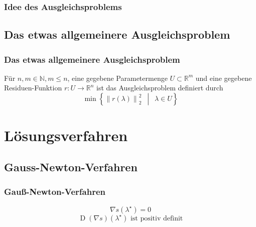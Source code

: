 \documentclass[aspectratio=169]{beamer}
\newcommand{\curvb}[1]{\left( #1 \right)}
\newcommand{\set}[2]{ \left\{ #1 \enspace \middle\vert \enspace #2 \right\} }
\newcommand{\norm}[1]{\left\| #1 \right\|}
\DeclareMathOperator{\Deriv}{\m{D}}
\newcommand{\SR}{\mathds{R}} %
\newcommand{\SN}{\mathds{N}} %
\newcommand{\m}[1]{\mathrm{#1}}
\begin{document}
			\begin{frame}
				\frametitle{Idee des Ausgleichsproblems}

				\begin{tcolorbox}
					\begin{figure}
							
						\end{figure}
				\end{tcolorbox}				
			\end{frame}
		

		\subsection{Das etwas allgemeinere Ausgleichsproblem} %
		\label{sub:das_etwas_allgemeinere_ausgleichsproblem}

			\begin{frame}
				\frametitle{Das etwas allgemeinere Ausgleichsproblem}

				\begin{tcolorbox}[title = Ausgleichsproblem mit Methode der kleinsten Quadrate]
					Für $n,m\in\SN, m\leq n$, eine gegebene Parametermenge $U\subset\SR^m$ und eine gegebene Residuen-Funktion $r:U\longrightarrow\SR^n$ ist das Ausgleichsproblem definiert durch
					\[ \min \set{\norm{r(\lambda)}^2_2}{\lambda\in U} \]
				\end{tcolorbox}
			\end{frame}
		


	\section{Lösungsverfahren}

	\subsection{Gauss-Newton-Verfahren} %
	\label{sec:gauss_newton_verfahren}
	
		\begin{frame}
			\frametitle{Gauß-Newton-Verfahren}

			\begin{tcolorbox}[title=Bedingungen für Minimum]
				\[ \nabla s(\lambda^\star) = 0 \]
				\[ \Deriv\curvb{\nabla s}(\lambda^\star) \text{ ist positiv definit} \]
			\end{tcolorbox}
		\end{frame}
\end{document}
